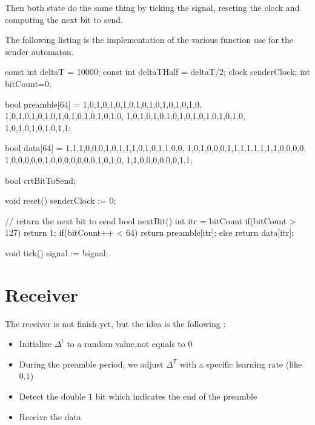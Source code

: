 \documentclass[a4paper,11pt]{report}
\begin{document}
Then both state do the same thing by ticking the signal, reseting the clock and
computing the next bit to send.

The following listing is the implementation of the various function use for the
sender automaton.

\begin{promelacode}
const int deltaT = 10000;
const int deltaTHalf = deltaT/2;
clock senderClock;
int bitCount=0;

bool preamble[64] = {
    1,0,1,0,1,0,1,0,1,0,1,0,1,0,1,0,1,0,
    1,0,1,0,1,0,1,0,1,0,1,0,1,0,1,0,1,0,
    1,0,1,0,1,0,1,0,1,0,1,0,1,0,1,0,1,0,
    1,0,1,0,1,0,1,0,1,1};

bool data[64] = {
    1,1,1,0,0,0,1,0,1,1,1,0,1,0,1,1,0,0,
    1,0,1,0,0,0,1,1,1,1,1,1,1,1,0,0,0,0,
    1,0,0,0,0,0,1,0,0,0,0,0,0,0,1,0,1,0,
    1,1,0,0,0,0,0,0,1,1};

bool crtBitToSend;

void reset()
{
    senderClock := 0;
}

// return the next bit to send
bool nextBit()
{
    int itr = bitCount %
    if(bitCount > 127) return 1;
    if(bitCount++ < 64) {
        return preamble[itr];
    } else {
        return data[itr];
    }
}

void tick()
{
    signal := !signal;
}
\end{promelacode}

\newpage

\section*{Receiver}

The receiver is not finish yet, but the idea is the following :

\begin{itemize}
\item Initialize $\Delta^t$ to a random value,not equals to $0$
\item During the preamble period, we adjust $\Delta^T$ with a specific learning
  rate (like $0.1$)
\item Detect the double $1$ bit which indicates the end of the preamble
\item Receive the data
\end{itemize}
\end{document}
